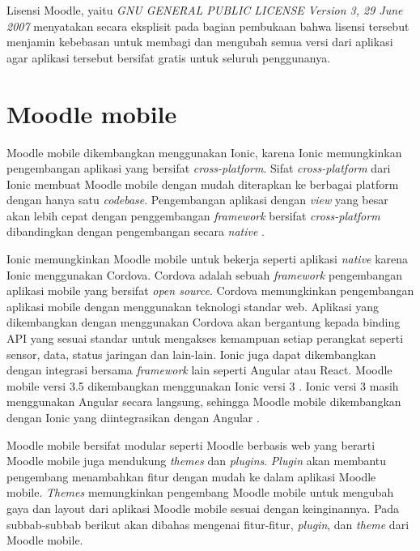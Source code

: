 Lisensi Moodle, yaitu \textit{GNU GENERAL PUBLIC LICENSE Version 3, 29 June 2007} menyatakan secara eksplisit pada bagian pembukaan bahwa lisensi tersebut menjamin kebebasan untuk membagi dan mengubah semua versi dari aplikasi agar aplikasi tersebut bersifat gratis untuk seluruh penggunanya\cite{GNU:preamble}.

\section{Moodle mobile}
\label{sec:Moodle mobile}
Moodle mobile dikembangkan menggunakan Ionic, karena Ionic memungkinkan pengembangan aplikasi yang bersifat \textit{cross-platform}\cite{Ionic:intro}. Sifat \textit{cross-platform} dari Ionic membuat Moodle mobile dengan mudah diterapkan ke berbagai platform dengan hanya satu \textit{codebase}. Pengembangan aplikasi dengan \textit{view} yang besar akan lebih cepat dengan penggembangan \textit{framework} bersifat \textit{cross-platform} dibandingkan dengan pengembangan secara \textit{native} \cite{cross-platform}. 

Ionic memungkinkan Moodle mobile untuk bekerja seperti aplikasi \textit{native} karena Ionic menggunakan Cordova. Cordova adalah sebuah \textit{framework} pengembangan aplikasi mobile yang bersifat \textit{open source}. Cordova memungkinkan pengembangan aplikasi mobile dengan menggunakan teknologi standar web. Aplikasi yang dikembangkan dengan menggunakan Cordova akan bergantung kepada binding API yang sesuai standar untuk mengakses kemampuan setiap perangkat seperti sensor, data, status jaringan dan lain-lain\cite{cordova:overview}. Ionic juga dapat dikembangkan dengan integrasi bersama \textit{framework} lain seperti Angular atau React. Moodle mobile versi 3.5 dikembangkan menggunakan Ionic versi 3 \cite{moodle:dev}. Ionic versi 3 masih menggunakan Angular secara langsung, sehingga Moodle mobile dikembangkan dengan Ionic yang diintegrasikan dengan Angular \cite{moodle:dev}.


Moodle mobile bersifat modular seperti Moodle berbasis web yang berarti Moodle mobile juga mendukung \textit{themes} dan \textit{plugins}. \textit{Plugin} akan membantu pengembang menambahkan fitur dengan mudah ke dalam aplikasi Moodle mobile. \textit{Themes} memungkinkan pengembang Moodle mobile untuk mengubah gaya dan layout dari aplikasi Moodle mobile sesuai dengan keinginannya. Pada subbab-subbab berikut akan dibahas mengenai fitur-fitur, \textit{plugin}, dan \textit{theme} dari Moodle mobile.
